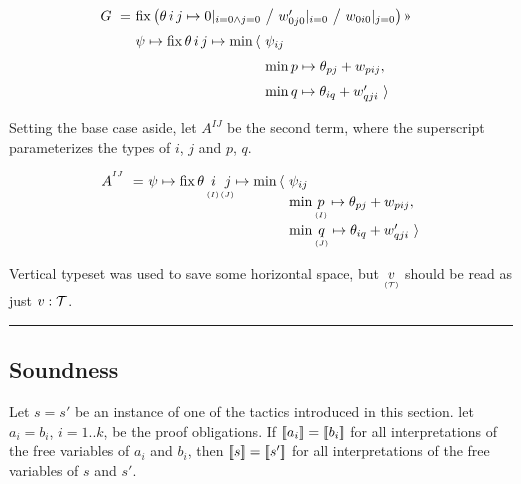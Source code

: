 \begin{equation}
  \renewcommand\arraystretch{1.5}
  \begin{array}{@{}l@{}l@{}l@{}}
    G ~=~ & \lspan2{\fix \big(\theta\,i\,j\mapsto
	              0|_{i=0\land j=0} ~\big/~ w'_{0j0}|_{i=0} ~\big/~ w_{0i0}|_{j=0}\big)\applt} \\
	      & \psi\mapsto \fix \theta\,i\,j\mapsto\min\,\langle~ & \psi_{ij} \\
	      & & \min p\mapsto\theta_{pj}+w_{pij}, \\
	      & & \min q\mapsto\theta_{iq}+w'_{qji} ~\rangle
  \end{array}
\end{equation}

Setting the base case aside, let $A^{IJ}$ be the second term,
where the superscript parameterizes the types of $i$, $j$ and $p$, $q$.

\newcommand\vtyped[2]{\underset{\scriptscriptstyle ( #2 )}{ #1 }}

\begin{equation}
  \renewcommand\arraystretch{1.2}
  \begin{array}{@{}l@{}l@{}c@{}c@{}l@{}l@{}}
    A^{^{IJ}} ~=~ 
	      & \psi\mapsto \fix \theta\,& i & j & \mapsto\min\,\langle~ & \psi_{ij} \\
	      & & ^{^{(I)}} & ^{^{(J)}} & & \min \vtyped p I \mapsto\theta_{pj}+w_{pij}, \\
	      & & & & & \min \vtyped q J \mapsto\theta_{iq}+w'_{qji} ~\rangle
  \end{array}
  \label{tactics:arbiter phase A}
\end{equation}

Vertical typeset was used to save some horizontal space, but $\vtyped v\T$
should be read as just $v:\mathcal{T}$.

\medskip
\hrule
\bigskip

\subsection{Soundness}

\renewenvironment{proof}{\noindent{\bf Proof.~}}{}

\begin{theorem}
Let $s=s'$ be an instance of one of the tactics introduced in this section.
let $a_i=b_i$, $i=1..k$, be the proof obligations. If $[\![{a_i}]\!]=[\![{b_i}]\!]$
for all interpretations of the free variables of $a_i$ and $b_i$, then
$[\![{s}]\!]=[\![{s'}]\!]$ for all interpretations of the free variables of $s$ and $s'$.
\end{theorem}

